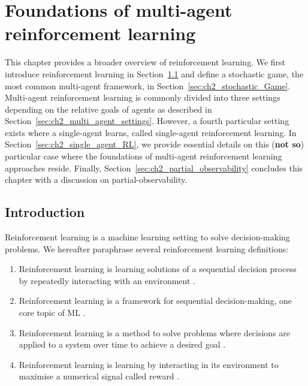 \chapter{Foundations of multi-agent reinforcement learning} \label{ch:marl}

\begin{chapter_outline}

This chapter provides a broader overview of reinforcement learning.
We first introduce reinforcement learning in Section~\ref{sec:ch2_Introduction} and define a stochastic game, the most common multi-agent framework, in Section~\ref{sec:ch2_stochastic_Game}.
Multi-agent reinforcement learning is commonly divided into three settings depending on the relative goals of agents as described in Section~\ref{sec:ch2_multi_agent_settings}.
However, a fourth particular setting exists where a single-agent learns, called single-agent reinforcement learning.
In Section~\ref{sec:ch2_single_agent_RL}, we provide essential details on this (\textbf{not so}) particular case where the foundations of multi-agent reinforcement learning approaches reside.
Finally, Section~\ref{sec:ch2_partial_observability} concludes this chapter with a discussion on partial-observability.

\end{chapter_outline}

\section{Introduction} 
\label{sec:ch2_Introduction}
Reinforcement learning is a machine learning setting to solve decision-making problems.
We hereafter paraphrase several reinforcement learning definitions:
\begin{enumerate}
\item Reinforcement learning is learning solutions of a sequential decision process by repeatedly interacting with an environment \citep{marl-book}.
\item Reinforcement learning is a framework for sequential decision-making, one core topic of ML \citep{introDeepRL}.
\item Reinforcement learning is a method to solve problems where decisions are applied to a system over time to achieve a desired goal \citep{BusoniuErnstBook}.
\item Reinforcement learning is learning by interacting in its environment to maximise a numerical signal called reward \citep{sutton2018reinforcement}.
\end{enumerate}

